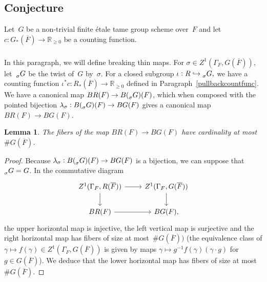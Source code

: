\documentclass[a4paper,english,12pt]{amsart}
\newcommand{\RR}{\mathbb{R}}
\newcommand{\oF}{\overline F}
\newcommand{\sG}{\prescript{}{\sigma}G}
\DeclareMathOperator{\Aut}{Aut}
\DeclareMathOperator{\Spec}{Spec}
\newtheorem{lem}[equation]{Lemma}
\numberwithin{equation}{subsection}
\begin{document}
\subsection{Conjecture}
Let~$G$ be a non-trivial finite \' etale tame group scheme over~$F$ and let $c:G_*(\oF)\to \RR_{\geq 0}$ be a counting function. %
\subsubsection{}\label{parbreakthin} In this paragraph, we will define breaking thin maps. For $\sigma\in Z^1(\Gamma_F, G(\oF))$, let~$\sG$ be the twist of~$G$ by~$\sigma$.  For a closed subgroup $\iota:R\hookrightarrow \sG,$ we have a counting function $\iota^*c:R_*(\oF)\to \RR_{\geq 0}$ defined in Paragraph~\ref{pullbackcountfunc}. We have a canonical map $BR(F)\to B(\sG)(F)$, which when composed with the pointed bijection $\lambda_{\sigma}:B(\sG)(F)\to BG(F)$ gives a canonical map $BR(F)\to BG(F)$.
\begin{lem}\label{finitefibers}
The fibers of the map $BR(F)\to BG(F)$ have cardinality at most~$\# G(\oF)$.
\end{lem}
\begin{proof}
Because $\lambda_{\sigma}:B(\sG)(F)\to BG(F)$ is a bijection, we can suppose that~$\sG=G$. In the commutative diagram
\[\begin{tikzcd}
	{Z^1(\Gamma_F, R(\overline F))} & {Z^1(\Gamma_F, G(\overline F))} \\
	{BR(F)} & {BG(F),}
	\arrow[from=1-1, to=1-2]
	\arrow[from=1-2, to=2-2]
	\arrow[from=1-1, to=2-1]
	\arrow[from=2-1, to=2-2]
\end{tikzcd}\]
the upper horizontal map is injective, the left vertical map is surjective and the right horizontal map has fibers of size at most~$\# G(\oF))$ (the equivalence class of $\gamma\mapsto f(\gamma)\in Z^1(\Gamma_F, G(\oF))$ is given by maps $\gamma\mapsto g^{-1}f(\gamma)(\gamma\cdot g)$ for $g\in G(\oF)$). We deduce that the lower horizontal map has fibers of size at most~$\# G(\oF)$.
\end{proof}
\end{document}
